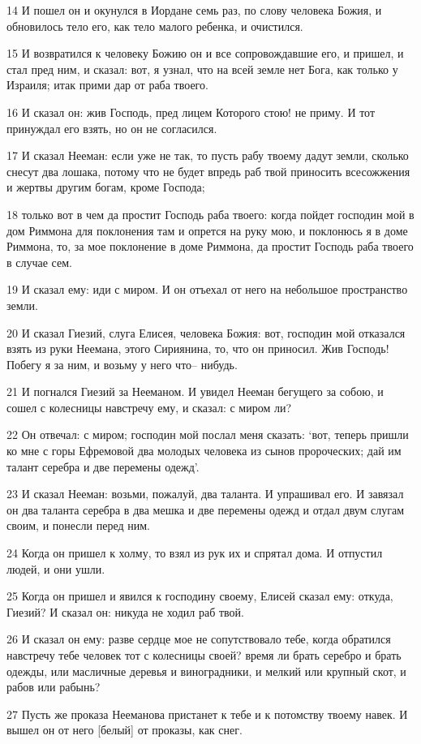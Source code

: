 \par 14 И пошел он и окунулся в Иордане семь раз, по слову человека Божия, и обновилось тело его, как тело малого ребенка, и очистился.
\par 15 И возвратился к человеку Божию он и все сопровождавшие его, и пришел, и стал пред ним, и сказал: вот, я узнал, что на всей земле нет Бога, как только у Израиля; итак прими дар от раба твоего.
\par 16 И сказал он: жив Господь, пред лицем Которого стою! не приму. И тот принуждал его взять, но он не согласился.
\par 17 И сказал Нееман: если уже не так, то пусть рабу твоему дадут земли, сколько снесут два лошака, потому что не будет впредь раб твой приносить всесожжения и жертвы другим богам, кроме Господа;
\par 18 только вот в чем да простит Господь раба твоего: когда пойдет господин мой в дом Риммона для поклонения там и опрется на руку мою, и поклонюсь я в доме Риммона, то, за мое поклонение в доме Риммона, да простит Господь раба твоего в случае сем.
\par 19 И сказал ему: иди с миром. И он отъехал от него на небольшое пространство земли.
\par 20 И сказал Гиезий, слуга Елисея, человека Божия: вот, господин мой отказался взять из руки Неемана, этого Сириянина, то, что он приносил. Жив Господь! Побегу я за ним, и возьму у него что-- нибудь.
\par 21 И погнался Гиезий за Нееманом. И увидел Нееман бегущего за собою, и сошел с колесницы навстречу ему, и сказал: с миром ли?
\par 22 Он отвечал: с миром; господин мой послал меня сказать: `вот, теперь пришли ко мне с горы Ефремовой два молодых человека из сынов пророческих; дай им талант серебра и две перемены одежд'.
\par 23 И сказал Нееман: возьми, пожалуй, два таланта. И упрашивал его. И завязал он два таланта серебра в два мешка и две перемены одежд и отдал двум слугам своим, и понесли перед ним.
\par 24 Когда он пришел к холму, то взял из рук их и спрятал дома. И отпустил людей, и они ушли.
\par 25 Когда он пришел и явился к господину своему, Елисей сказал ему: откуда, Гиезий? И сказал он: никуда не ходил раб твой.
\par 26 И сказал он ему: разве сердце мое не сопутствовало тебе, когда обратился навстречу тебе человек тот с колесницы своей? время ли брать серебро и брать одежды, или масличные деревья и виноградники, и мелкий или крупный скот, и рабов или рабынь?
\par 27 Пусть же проказа Нееманова пристанет к тебе и к потомству твоему навек. И вышел он от него [белый] от проказы, как снег.

